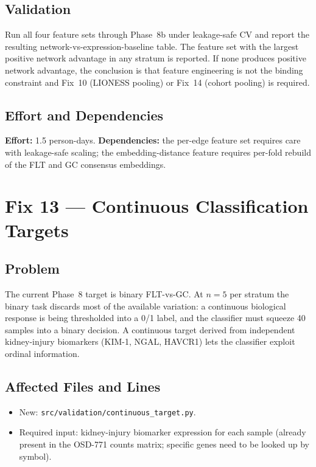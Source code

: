 \documentclass[11pt]{article}
\newcommand{\code}[1]{\texttt{#1}}
\begin{document}
\subsection{Validation}

Run all four feature sets through Phase~8b under leakage-safe CV and report the resulting network-vs-expression-baseline table. The feature set with the largest positive network advantage in any stratum is reported. If none produces positive network advantage, the conclusion is that feature engineering is not the binding constraint and Fix~10 (LIONESS pooling) or Fix~14 (cohort pooling) is required.

\subsection{Effort and Dependencies}

\textbf{Effort:} 1.5 person-days. \textbf{Dependencies:} the per-edge feature set requires care with leakage-safe scaling; the embedding-distance feature requires per-fold rebuild of the FLT and GC consensus embeddings.

\section{Fix 13 --- Continuous Classification Targets}

\subsection{Problem}

The current Phase~8 target is binary FLT-vs-GC. At $n{=}5$ per stratum the binary task discards most of the available variation: a continuous biological response is being thresholded into a 0/1 label, and the classifier must squeeze 40 samples into a binary decision. A continuous target derived from independent kidney-injury biomarkers (KIM-1, NGAL, HAVCR1) lets the classifier exploit ordinal information.

\subsection{Affected Files and Lines}

\begin{itemize}[leftmargin=*]
\item New: \code{src/validation/continuous\_target.py}.
\item Required input: kidney-injury biomarker expression for each sample (already present in the OSD-771 counts matrix; specific genes need to be looked up by symbol).
\end{itemize}
\end{document}
